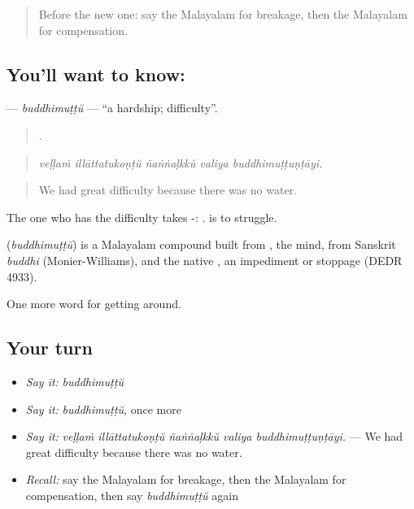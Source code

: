 \label{lesson:ML-C515-buddhimuttu}



\begin{quote}
Before the new one: say the Malayalam for breakage, then the Malayalam for compensation.
\end{quote}

\subsection*{You'll want to know: }
\textbf{} — \emph{buddhimuṭṭŭ} — \textquotedblleft{}a hardship; difficulty\textquotedblright{}.

\begin{quote}
    .
\end{quote}

\begin{quote}
\emph{veḷḷaṁ illāttatukoṇṭŭ ñaṅṅaḷkkŭ valiya buddhimuṭṭuṇṭāyi.}
\end{quote}

\begin{quote}
We had great difficulty because there was no water.
\end{quote}

The one who has the difficulty takes -:  .  is to struggle.

\begin{cousinweb}
\textbf{} (\emph{buddhimuṭṭŭ}) is a Malayalam compound built from , the mind, from Sanskrit \emph{buddhi} (Monier-Williams), and the native , an impediment or stoppage (DEDR 4933).
\end{cousinweb}

\begin{grammarlens}[title={What you've built}]
One more word for getting around.
\end{grammarlens}

\subsection*{Your turn}
\begin{itemize}
\raggedright
  \item \emph{Say it:} \emph{buddhimuṭṭŭ}
  \item \emph{Say it:} \emph{buddhimuṭṭŭ}, once more
  \item \emph{Say it:} \emph{veḷḷaṁ illāttatukoṇṭŭ ñaṅṅaḷkkŭ valiya buddhimuṭṭuṇṭāyi.} — We had great difficulty because there was no water.
  \item \emph{Recall:} say the Malayalam for breakage, then the Malayalam for compensation, then say \emph{buddhimuṭṭŭ} again
\end{itemize}

